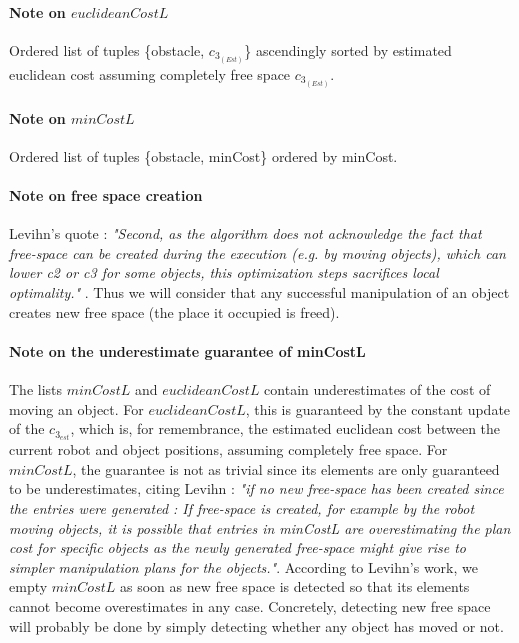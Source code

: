 \paragraph{Note on $euclideanCostL$}\label{euclideanCostL_note} Ordered list of tuples \{obstacle, $c_{3_{(Est)}}$\} ascendingly sorted by estimated euclidean cost assuming completely free space $c_{3_{(Est)}}$.

\paragraph{Note on $minCostL$}\label{minCostL_note} Ordered list of tuples \{obstacle, minCost\} ordered by minCost.

\paragraph{Note on free space creation}\label{free_space_note} Levihn's quote : \textit{"Second, as the algorithm does not acknowledge the fact that free-space can be created during the execution (e.g. by moving objects), which can lower c2 or c3 for some objects, this optimization steps sacrifices local optimality."} . Thus we will consider that any successful manipulation of an object creates new free space (the place it occupied is freed).

\paragraph{Note on the underestimate guarantee of minCostL}\label{underestimate_note} The lists $minCostL$ and $euclideanCostL$ contain underestimates of the cost of moving an object. For $euclideanCostL$, this is guaranteed by the constant update of the $c_{3_{est}}$, which is, for remembrance, the estimated euclidean cost between the current robot and object positions, assuming completely free space. For $minCostL$, the guarantee is not as trivial since its elements are only guaranteed to be underestimates, citing Levihn : \textit{"if no new free-space has been created since the entries were generated : If free-space is created, for example by the robot moving objects, it is possible that entries in minCostL are overestimating the plan cost for specific objects as the newly generated free-space might give rise to simpler manipulation plans for the objects."}. According to Levihn's work, we empty $minCostL$ as soon as new free space is detected so that its elements cannot become overestimates in any case. Concretely, detecting new free space will probably be done by simply detecting whether any object has moved or not.

